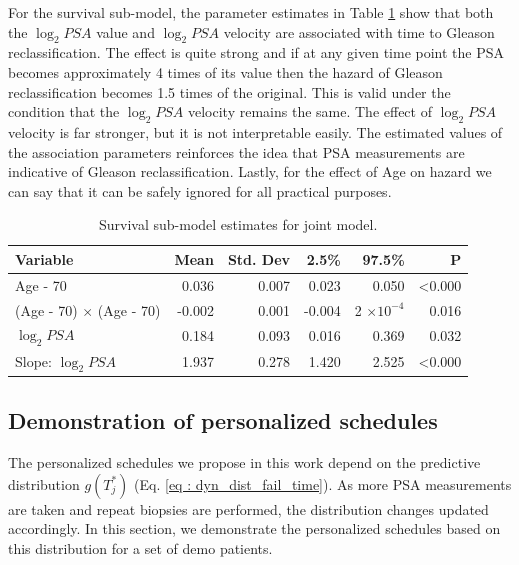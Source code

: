 For the survival sub-model, the parameter estimates in Table \ref{tab : PSA_survival} show that both the $\log_2 PSA$ value and $\log_2 PSA$ velocity are associated with time to Gleason reclassification. The effect is quite strong and if at any given time point the PSA becomes approximately 4 times of its value then the hazard of Gleason reclassification  becomes 1.5 times of the original. This is valid under the condition that the $\log_2 PSA$ velocity remains the same. The effect of $\log_2 PSA$ velocity is far stronger, but it is not interpretable easily. The estimated values of the association parameters reinforces the idea that PSA measurements are indicative of Gleason reclassification. Lastly, for the effect of Age on hazard we can say that it can be safely ignored for all practical purposes.

\begin{table}[!htb]
\centering
\caption{Survival sub-model estimates for joint model.}
\captionsetup{justification=centering}
\label{tab : PSA_survival}
\begin{tabular}{@{}lrrrrr@{}}
\toprule
Variable                      & Mean   & Std. Dev & 2.5\%  & 97.5\%                 & P              \\ \midrule
Age - 70                      & 0.036  & 0.007    & 0.023  & 0.050                  & \textless0.000 \\
(Age - 70) $\times$ (Age - 70) & -0.002 & 0.001    & -0.004 & 2 $\times 10^{-4}$ & 0.016          \\
$\log_2 PSA$                  & 0.184  & 0.093    & 0.016 & 0.369                  & 0.032          \\
Slope: $\log_2 PSA$           & 1.937  & 0.278    & 1.420  & 2.525                  & \textless0.000 \\ \bottomrule
\end{tabular}
\end{table}

\subsection{Demonstration of personalized schedules}
The personalized schedules we propose in this work depend on the predictive distribution $g(T^*_j)$ (Eq. \ref{eq : dyn_dist_fail_time}). As more PSA measurements are taken and repeat biopsies are performed, the distribution changes updated accordingly. In this section, we demonstrate the personalized schedules based on this distribution for a set of demo patients.\\

